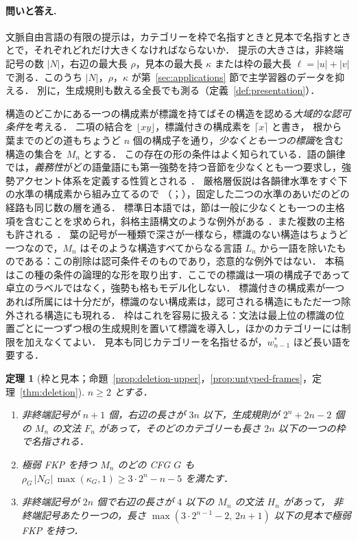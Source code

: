 \documentclass[11pt,a4paper]{ltjsarticle}
\numberwithin{equation}{section}
\theoremstyle{plain}
\theoremstyle{definition}
\theoremstyle{remark}
\theoremstyle{plain}
\newtheorem{mainthm}{定理}
\newcommand{\Lfl}{\lfloor}
\newcommand{\Rfl}{\rfloor}
\newcommand{\Lce}{\lceil}
\newcommand{\Rce}{\rceil}
\begin{document}
\paragraph{問いと答え.}
文脈自由言語の有限の提示は，カテゴリーを枠で名指すときと見本で名指すときとで，それぞれどれだけ大きくなければならないか．
提示の大きさは，非終端記号の数 $|N|$，右辺の最大長 $\rho$，見本の最大長 $\kappa$ または枠の最大長 $\ell=|u|+|v|$ で測る．このうち $|N|$，$\rho$，$\kappa$ が第~\ref{sec:applications} 節で主学習器のデータを抑える．
別に，生成規則も数える全長でも測る（定義~\ref{def:presentation}）．

構造のどこかにある一つの構成素が標識を持てばその構造を認める\emph{大域的な認可条件}を考える．
二項の結合を $\Lfl xy\Rfl$，標識付きの構成素を $\Lce x\Rce$ と書き，
根から葉までのどの道もちょうど $n$ 個の構成子を通り，\emph{少なくとも一つの標識}を含む構造の集合を $M_n$ とする．
この存在の形の条件はよく知られている．語の韻律では，\emph{義務性}がどの語彙語にも第一強勢を持つ音節を少なくとも一つ要求し，強勢アクセント体系を定義する性質とされる \citep{hyman2006}．
厳格層仮説は各韻律水準をすぐ下の水準の構成素から組み立てるので （\citealp[p.~26]{selkirk1984}；\citealp[p.~7]{nespor-vogel1986}），固定した二つの水準のあいだのどの経路も同じ数の層を通る．
標準日本語では，節は一般に少なくとも一つの主格項を含むことを求められ，斜格主語構文のような例外がある \citep{kishimoto2010}．また複数の主格も許される \citep[Ch.~3]{kuno1973}．
葉の記号が一種類で深さが一様なら，標識のない構造はちょうど一つなので，$M_n$ はそのような構造すべてからなる言語 $L_n$ から一語を除いたものである：この削除は認可条件そのものであり，恣意的な例外ではない．
本稿はこの種の条件の論理的な形を取り出す．ここでの標識は一項の構成子であって卓立のラベルではなく，強勢も格もモデル化しない．
標識付きの構成素が一つあれば所属には十分だが，標識のない構成素は，認可される構造にもただ一つ除外される構造にも現れる．
枠はこれを容易に扱える：文法は最上位の標識の位置ごとに一つずつ根の生成規則を置いて標識を導入し，ほかのカテゴリーには制限を加えなくてよい．
見本も同じカテゴリーを名指せるが，$w^*_{n-1}$ ほど長い語を要する．

\begin{mainthm}[枠と見本；命題~\ref{prop:deletion-upper}，\ref{prop:untyped-frames}，定理~\ref{thm:deletion}]
$n\ge2$ とする．
\begin{enumerate}[label=\textup{(\roman*)},nosep]
\item 非終端記号が $n+1$ 個，右辺の長さが $3n$ 以下，生成規則が $2^n+2n-2$ 個の $M_n$ の文法 $F_n$ があって，そのどのカテゴリーも長さ $2n$ 以下の一つの枠で名指される．
\item 極弱 FKP を持つ $M_n$ のどの CFG $G$ も $\rho_G\,|N_G|\,\max(\kappa_G,1)\ge3\cdot2^n-n-5$ を満たす．
\item 非終端記号が $2n$ 個で右辺の長さが $4$ 以下の $M_n$ の文法 $H_n$ があって，
非終端記号あたり一つの，長さ $\max(3\cdot2^{n-1}-2,\,2n+1)$ 以下の見本で極弱 FKP を持つ．
\end{enumerate}
\end{mainthm}
\end{document}
